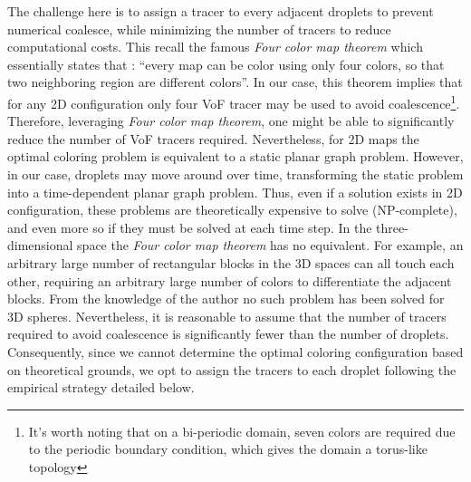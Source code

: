 The challenge here is to assign a tracer to every adjacent droplets to prevent numerical coalesce, while minimizing the number of tracers to reduce computational costs. 
This recall the famous \textit{Four color map theorem} \citep{kempe1879colours} which essentially states that : 
\enquote{every map can be color using only four colors, so that two neighboring region are different colors}. 
In our case, this theorem implies that for any 2D configuration only four VoF tracer may be used to avoid coalescence\footnote{It's worth noting that on a bi-periodic domain, seven colors are required due to the periodic boundary condition, which gives the domain a torus-like topology  }. 
Therefore, leveraging \textit{Four color map theorem}, one might be able to significantly reduce the number of VoF tracers required. 
Nevertheless, for 2D maps the optimal coloring problem is equivalent to a static planar graph problem. 
However, in our case, droplets may move around over time, transforming the static problem into a time-dependent planar graph problem. 
Thus, even if a solution exists in 2D configuration, these problems are theoretically expensive to solve (NP-complete), and even more so if they must be solved at each time step.  
In the three-dimensional space the \textit{Four color map theorem} has no equivalent. 
For example, an arbitrary large number of rectangular blocks in the 3D spaces can all touch each other, requiring an arbitrary large number of colors to differentiate the adjacent blocks\citep{magnant2011coloring}. 
From the knowledge of the author no such problem has been solved for 3D spheres. 
Nevertheless, it is reasonable to assume that the number of tracers required to avoid coalescence is significantly fewer than the number of droplets.
Consequently, since we cannot determine the optimal coloring configuration based on theoretical grounds, we opt to assign the tracers to each droplet following the empirical strategy detailed below.

